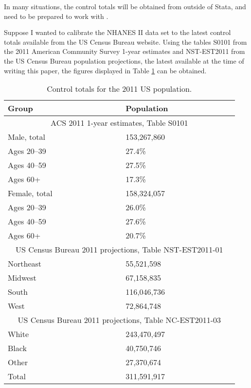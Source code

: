 In many situations, the control totals will be obtained
from outside of Stata, and need to be prepared to work
with .

\begin{stexample}[Example 2]

Suppose I wanted to calibrate
the NHANES II data set to the latest control totals available
from the US Census Bureau website. Using the tables
S0101 from the 2011 American Community Survey 1-year estimates
and NST-EST2011 from the US Census Bureau population projections,
the latest available at the time of writing this paper,
the figures displayed in Table \ref{tab:example2} can be obtained.

\begin{table}
\caption{Control totals for the 2011 US population.\label{tab:example2}}

\centering

\begin{tabular}{p{5cm}l}
    Group & Population \\
    \hline
    \multicolumn{2}{c}{~~ACS 2011 1-year estimates, Table S0101~~} \\
    Male, total & 153,267,860 \\
    Ages 20--39 & 27.4\% \\
    Ages 40--59 & 27.5\% \\
    Ages 60+    & 17.3\% \\
    Female, total & 158,324,057 \\
    Ages 20--39 & 26.0\% \\
    Ages 40--59 & 27.6\% \\
    Ages 60+    & 20.7\% \\
    \multicolumn{2}{c}{~~US Census Bureau 2011 projections, Table NST-EST2011-01~~} \\
    Northeast & 55,521,598 \\
    Midwest   & 67,158,835 \\
    South     & 116,046,736 \\
    West      & 72,864,748 \\
    \multicolumn{2}{c}{~~US Census Bureau 2011 projections, Table NC-EST2011-03~~} \\
    White     & 243,470,497 \\
    Black     & 40,750,746 \\
    Other     & 27,370,674 \\
    \hline
    Total     & 311,591,917
\end{tabular}
\end{table}


\end{stexample}
